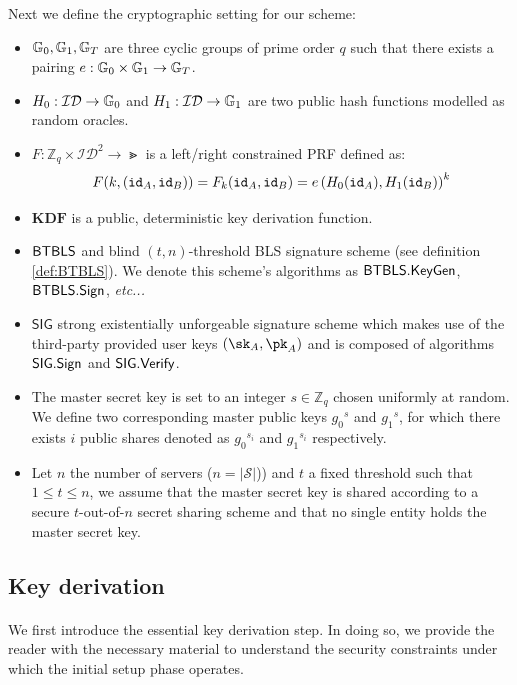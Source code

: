 		\noindent Next we define the cryptographic setting for our scheme:
		\begin{itemize}
			\item $\mathbb{G}_0, \mathbb{G}_1, \mathbb{G}_T$ are three cyclic groups of prime order $q$ such that there exists a pairing $e : \mathbb{G}_0 \times \mathbb{G}_1 \rightarrow \mathbb{G}_T$.
			\item $H_0: \mathcal{ID}\rightarrow \mathbb{G}_0$  and $H_1: \mathcal{ID} \rightarrow \mathbb{G}_1$ are two public hash functions modelled as random oracles.
			\item $F: \mathbb{Z}_q \times \mathcal{ID}^2  \rightarrow \Gt$ is a left/right constrained PRF defined as: \begin{equation}
				F(k, (\mathtt{id}_A, \mathtt{id}_B)) = F_k(\mathtt{id}_A, \mathtt{id}_B)= e\left(H_0(\mathtt{id}_A), H_1(\mathtt{id}_B) \right)^k
			\end{equation}
			\item $\mathbf{KDF}$ is a public, deterministic key derivation function.
			\item $\mathsf{BTBLS}$ and blind $(t,n)$-threshold BLS signature scheme (see definition \autoref{def:BTBLS}). We denote this scheme's algorithms as $\mathsf{BTBLS} . \mathsf{KeyGen}$, $\mathsf{BTBLS} . \mathsf{Sign}$, \textit{etc...} 
			\item $\mathsf{SIG}$ strong existentially unforgeable signature scheme which makes use of the third-party provided user keys $(\sk_A,\pk_A)$ and is composed of algorithms $\mathsf{SIG} . \mathsf{Sign}$ and $\mathsf{SIG} . \mathsf{Verify}$.
			\item The master secret key is set to an integer $s \in \mathbb{Z}_q$ chosen uniformly at random. We define two corresponding master public keys ${g_0}^s$ and ${g_1}^s$, for which there exists $i$ public shares denoted as ${g_0}^{s_i}$ and ${g_1}^{s_i}$ respectively.
			\item Let $n$ the number of servers ($n=|\mathcal{S}|$)) and $t$ a fixed threshold such that $1 \leq t \leq n$, we assume that the master secret key is shared according to a secure $t$-out-of-$n$ secret sharing scheme and that no single entity holds the master secret key.
		\end{itemize}

	\subsection{Key derivation}
	
		\paragraph{} We first introduce the essential key derivation step. In doing so, we provide the reader with the necessary material to understand the security constraints under which the initial setup phase operates.
		
